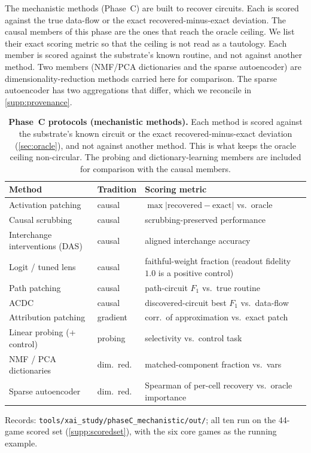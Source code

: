The mechanistic methods (Phase~C) are built to recover circuits. Each is scored
against the true data-flow or the exact recovered-minus-exact deviation. The causal members
of this phase are the ones that reach the oracle ceiling. We list their exact scoring metric
so that the ceiling is not read as a tautology. Each member is scored against the substrate's
known routine, and not against another method. Two members (NMF/PCA dictionaries and the
sparse autoencoder) are dimensionality-reduction methods carried here for comparison. The
sparse autoencoder has two aggregations that differ, which we reconcile in
\Sectionname\ref{supp:provenance}.

\begin{table}[t]
\centering
\caption{\textbf{Phase~C protocols (mechanistic methods).} Each method is scored against the
substrate's known circuit or the exact recovered-minus-exact deviation (\Sectionname\ref{sec:oracle}), and not
against another method. This is what keeps the oracle ceiling non-circular. The probing and
dictionary-learning members are included for comparison with the causal members.}
\label{supp:tab:phaseC}
\scriptsize
\setlength{\tabcolsep}{4pt}
\begin{tabular}{@{}p{3.4cm}p{1.4cm}p{5.2cm}@{}}
\toprule
Method & Tradition & Scoring metric \\
\midrule
Activation patching & causal & $\max|\text{recovered}-\text{exact}|$ vs.\ oracle \\
Causal scrubbing & causal & scrubbing-preserved performance \\
Interchange interventions (DAS) & causal & aligned interchange accuracy \\
Logit / tuned lens & causal & faithful-weight fraction (readout fidelity $1.0$ is a positive control) \\
Path patching & causal & path-circuit $F_1$ vs.\ true routine \\
ACDC & causal & discovered-circuit best $F_1$ vs.\ data-flow \\
Attribution patching & gradient & corr.\ of approximation vs.\ exact patch \\
Linear probing (+ control) & probing & selectivity vs.\ control task \\
NMF / PCA dictionaries & dim.\ red. & matched-component fraction vs.\ vars \\
Sparse autoencoder & dim.\ red. & Spearman of per-cell recovery vs.\ oracle importance \\
\bottomrule
\end{tabular}

\smallskip
\noindent\scriptsize Records: \texttt{tools/xai\_study/phaseC\_mechanistic/out/}; all ten run
on the 44-game scored set (\Sectionname\ref{supp:scoredset}), with the six core games as the
running example.
\end{table}

